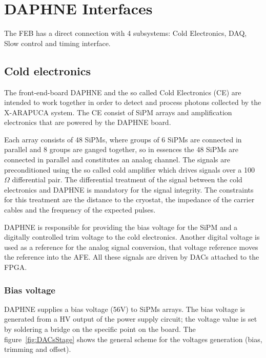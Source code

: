 \section{DAPHNE Interfaces}
\label{sec:interfaces}

The FEB has a direct connection with 4 subsystems: Cold Electronics, DAQ, Slow control and timing interface.

\subsection{Cold electronics}

The front-end-board DAPHNE and the so called Cold Electronics (CE) are intended to work together in order to detect and process photons collected by the X-ARAPUCA system. The CE consist of SiPM arrays and amplification electronics that are powered by the DAPHNE board.  

Each array consists of 48 SiPMs, where groups of 6 SiPMs are connected in parallel and 8 groups are ganged together, so in essences the 48 SiPMs are connected in parallel and constitutes an analog channel. The signals  are preconditioned using the so called cold amplifier which drives signals over a 100 $\Omega$  differential pair. The differential treatment of the signal between the cold electronics and DAPHNE is mandatory for the signal integrity. The constraints for this treatment are the distance to the cryostat, the impedance of the carrier cables and the frequency of the expected pulses. 
 
 DAPHNE is responsible for providing the bias voltage for the SiPM and a digitally controlled trim voltage to the cold electronics. Another digital voltage is used as a reference for the analog signal conversion, that voltage reference moves the reference into the AFE. All these signals are driven by DACs attached to the FPGA. 


\subsubsection{Bias voltage}

DAPHNE supplies a bias voltage (56V) to SiPMs arrays. The bias voltage is generated from a HV output of the power supply circuit; the voltage value is set by soldering a bridge on the specific point on the board. The figure~\ref{fig:DACsStage} shows the general scheme for the voltages generation (bias, trimming and offset). 

